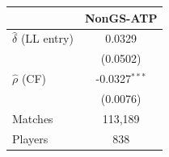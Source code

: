 \begin{tabular}{lc}
\toprule
 & NonGS-ATP \\
\midrule
$\hat{\delta}$ (LL entry) & 0.0329 \\
 & (0.0502) \\
$\hat{\rho}$ (CF) & -0.0327$^{***}$ \\
 & (0.0076) \\
\midrule
Matches & 113,189 \\
Players & 838 \\
\bottomrule
\end{tabular}

